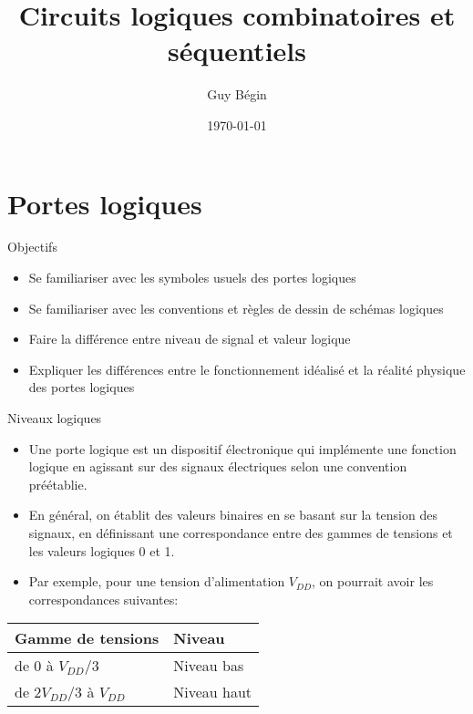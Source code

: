 \documentclass[presentation]{beamer}
\author{Guy Bégin}
\date{\today}
\title{Circuits logiques combinatoires et séquentiels}
\begin{document}
\maketitle

\section{Portes logiques}
\label{sec:orgec4e083}

\begin{frame}[label={sec:orga00e654}]{Objectifs}
\begin{itemize}
\item Se familiariser avec les symboles usuels des portes logiques
\item Se familiariser avec les conventions et règles de dessin de schémas
logiques
\item Faire la différence entre niveau de signal et valeur logique
\item Expliquer les différences entre le fonctionnement idéalisé
et la réalité physique des portes logiques
\end{itemize}
\end{frame}

\begin{frame}[label={sec:org98896f4}]{Niveaux logiques}
\begin{itemize}
\item Une porte logique est un dispositif électronique qui implémente une fonction logique en agissant sur des signaux électriques selon une convention préétablie.

\item En général, on établit des valeurs binaires en se basant sur la tension des signaux, en définissant une correspondance entre des gammes de tensions et les valeurs logiques 0 et 1.

\item Par exemple, pour une tension d'alimentation \(V_{DD}\), on pourrait avoir les correspondances suivantes:
\end{itemize}

\begin{center}
\begin{tabular}{ll}
Gamme de tensions & Niveau\\[0pt]
\hline
de 0 à  \(V_{DD}/3\) & Niveau bas\\[0pt]
de \(2V_{DD}/3\) à  \(V_{DD}\) & Niveau haut\\[0pt]
\end{tabular}
\end{center}
\end{frame}
\end{document}
